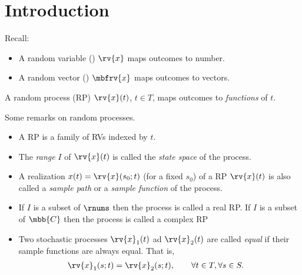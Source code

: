 \section{Introduction}
Recall: 
\begin{itemize}
    \item A random variable () $\rv{x}$ maps outcomes to number.
    \item A random vector () $\mbfrv{x}$ maps outcomes to vectors.
\end{itemize}
\begin{mydefinition}
    \label{def:random process}
    A random process (RP) $\rv{x}(t)$, $t\in T$, maps outcomes to \emph{functions} of $t$.
\end{mydefinition}
\begin{myremark}
    Some remarks on random processes. 
    \begin{itemize}
        \item A RP is a family of RVs indexed by $t$.
        \item The \emph{range} $I$ of $\rv{x}(t)$ is called the \emph{state space} of the process.
        \item A realization $x(t) = \rv{x}(s_{0}; t)$ (for a fixed $s_{0}$) of a RP $\rv{x}(t)$ is also called a \emph{sample path} or a \emph{sample function} of the process.
        \item If $I$ is a subset of $\rnums$ then the process is called a real RP. If $I$ is a subset of $\mbb{C}$ then the process is called a complex RP
        \item Two stochastic processes $\rv{x}_{1}(t)$ ad $\rv{x}_{2}(t)$ are called \emph{equal} if their sample functions are always equal. That is,
        \begin{align}
            \rv{x}_{1}(s; t) &= \rv{x}_{2}(s; t), \qquad \forall t\in T, \forall s\in S.
        \end{align}
    \end{itemize}
\end{myremark}


